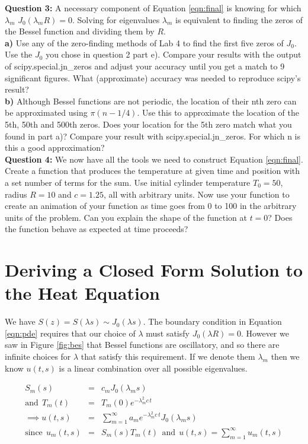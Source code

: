 \documentclass[a4paper,12pt]{article}
\begin{document}
\textbf{Question 3:} A necessary component of Equation \ref{eqn:final} is knowing for which $\lambda_m$ $J_0(\lambda_m R) = 0$. Solving for eigenvalues $\lambda_m$ is equivalent to finding the zeros of the Bessel function and dividing them by $R$.\\
\textbf{a)} Use any of the zero-finding methods of Lab 4 to find the first five zeros of $J_0$. Use the $J_0$ you chose in question 2 part e). Compare your results with the output of scipy.special.jn\_zeros and adjust your accuracy until you get a match to 9 significant figures. What (approximate) accuracy was needed to reproduce scipy's result?\\
\textbf{b)} Although Bessel functions are not periodic, the location of their nth zero can be approximated using $\pi\left(n-1/4\right)$. Use this to approximate the location of the 5th, 50th and 500th zeros. Does your location for the 5th zero match what you found in part a)? Compare your result with scipy.special.jn\_zeros. For which n is this a good approximation?  \\

\textbf{Question 4:} We now have all the tools we need to construct Equation \ref{eqn:final}. Create a function that produces the temperature at given time and position with a set number of terms for the sum. Use initial cylinder temperature $T_0 = 50$, radius $R = 10$ and $c = 1.25$, all with arbitrary units. Now use your function to create an animation of your function as time goes from 0 to 100 in the arbitrary units of the problem. Can you explain the shape of the function at $t = 0$? Does the function behave as expected at time proceeds?

\appendix

\section{Deriving a Closed Form Solution to the Heat Equation}
\label{app:deriv}

We have $S(z) = S(\lambda s) \sim J_0(\lambda s)$. The boundary condition in Equation \ref{eqn:pde} requires that our choice of $\lambda$ must satisfy $J_0(\lambda R) = 0$. However we saw in Figure \ref{fig:bes} that Bessel functions are oscillatory, and so there are infinite choices for $\lambda$ that satisfy this requirement. If we denote them $\lambda_m$ then we know $u(t,s)$ is a linear combination over all possible eigenvalues.

\begin{eqnarray}
S_m(s) &=& c_m J_0(\lambda_m s)\nonumber\\
\mathrm{and}\:\: T_m(t) &=& T_m(0)e^{-\lambda_m^2 c\,t}\nonumber\\
\implies u(t,s) &=& \sum_{m=1}^{\infty}a_m e^{-\lambda_m^2 c\,t} J_0(\lambda_m s)\nonumber\\
\mathrm{since}\:\: u_m(t,s) &=& S_m(s)T_m(t)\:\:\mathrm{and}\:\: u(t,s) = \sum_{m=1}^{\infty}u_m(t,s)\nonumber 
\end{eqnarray}
\end{document}
